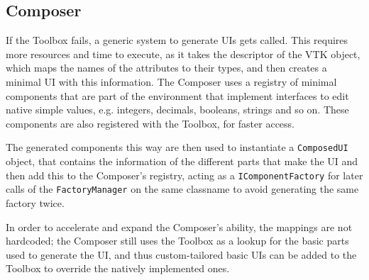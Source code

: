 
\subsection{Composer}
\label{sec:design-uicomposer}

If the Toolbox fails, a generic system to generate UIs gets called. This requires more resources and time to execute, as it takes the descriptor of the VTK object, which maps the names of the attributes to their types, and then creates a minimal UI with this information. The Composer uses a registry of minimal components that are part of the environment that implement interfaces to edit native simple values, e.g. integers, decimals, booleans, strings and so on. These components are also registered with the Toolbox, for faster access.

The generated components this way are then used to instantiate a \verb|ComposedUI| object, that contains the information of the different parts that make the UI and then add this to the Composer's registry, acting as a \verb|IComponentFactory| for later calls of the \verb|FactoryManager| on the same classname to avoid generating the same factory twice.

In order to accelerate and expand the Composer's ability, the mappings are not hardcoded; the Composer still uses the Toolbox as a lookup for the basic parts used to generate the UI, and thus custom-tailored basic UIs can be added to the Toolbox to override the natively implemented ones.

